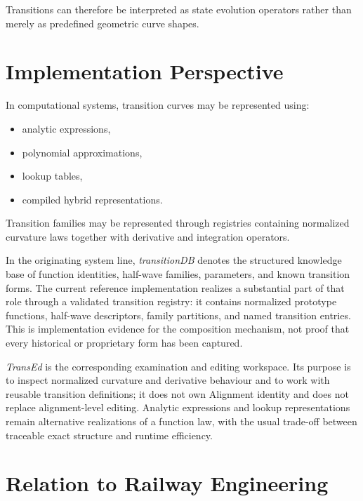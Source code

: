 Transitions can therefore be interpreted as state evolution operators
rather than merely as predefined geometric curve shapes.


\section{Implementation Perspective}

In computational systems, transition curves may be represented using:
\begin{itemize}
\item analytic expressions,
\item polynomial approximations,
\item lookup tables,
\item compiled hybrid representations.
\end{itemize}

Transition families may be represented through registries containing
normalized curvature laws together with derivative and integration
operators.

In the originating system line, \emph{transitionDB} denotes the structured
knowledge base of function identities, half-wave families, parameters, and
known transition forms. The current reference implementation realizes a
substantial part of that role through a validated transition registry: it
contains normalized prototype functions, half-wave descriptors, family
partitions, and named transition entries. This is implementation evidence for
the composition mechanism, not proof that every historical or proprietary
form has been captured.

\emph{TransEd} is the corresponding examination and editing workspace. Its
purpose is to inspect normalized curvature and derivative behaviour and to
work with reusable transition definitions; it does not own Alignment identity
and does not replace alignment-level editing. Analytic expressions and lookup
representations remain alternative realizations of a function law, with the
usual trade-off between traceable exact structure and runtime efficiency.

\section{Relation to Railway Engineering}


